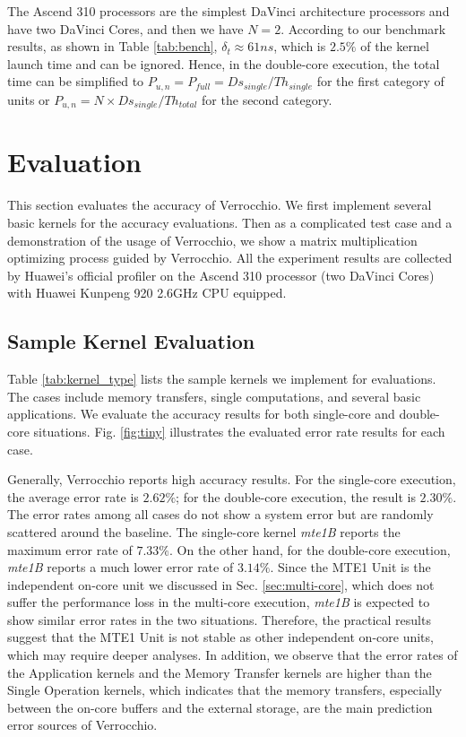 The Ascend 310 processors are the simplest DaVinci architecture processors and have two DaVinci Cores, and then we have $N = 2$. According to our benchmark results, as shown in Table \ref{tab:bench}, $\delta_{t} \approx 61 ns$, which is $2.5\%$ of the kernel launch time and can be ignored. Hence, in the double-core execution, the total time can be simplified to $P_{u, n} = P_{full} = Ds_{single} / Th_{single}$ for the first category of units or $P_{u, n} = N \times Ds_{single} / Th_{total}$ for the second category.


\section{Evaluation}

This section evaluates the accuracy of Verrocchio. We first implement several basic kernels for the accuracy evaluations. Then as a complicated test case and a demonstration of the usage of Verrocchio, we show a matrix multiplication optimizing process guided by Verrocchio. All the experiment results are collected by Huawei's official profiler on the Ascend 310 processor (two DaVinci Cores) with Huawei Kunpeng 920 2.6GHz CPU equipped.

\subsection{Sample Kernel Evaluation}

Table \ref{tab:kernel_type} lists the sample kernels we implement for evaluations. The cases include memory transfers, single computations, and several basic applications. We evaluate the accuracy results for both single-core and double-core situations. Fig. \ref{fig:tiny} illustrates the evaluated error rate results for each case.

Generally, Verrocchio reports high accuracy results. For the single-core execution, the average error rate is $2.62\%$; for the double-core execution, the result is $2.30\%$. The error rates among all cases do not show a system error but are randomly scattered around the baseline. The single-core kernel \textit{mte1B} reports the maximum error rate of $7.33\%$. On the other hand, for the double-core execution, \textit{mte1B} reports a much lower error rate of $3.14\%$. Since the MTE1 Unit is the independent on-core unit we discussed in Sec. \ref{sec:multi-core}, which does not suffer the performance loss in the multi-core execution, \textit{mte1B} is expected to show similar error rates in the two situations. Therefore, the practical results suggest that the MTE1 Unit is not stable as other independent on-core units, which may require deeper analyses. In addition, we observe that the error rates of the Application kernels and the Memory Transfer kernels are higher than the Single Operation kernels, which indicates that the memory transfers, especially between the on-core buffers and the external storage, are the main prediction error sources of Verrocchio.

